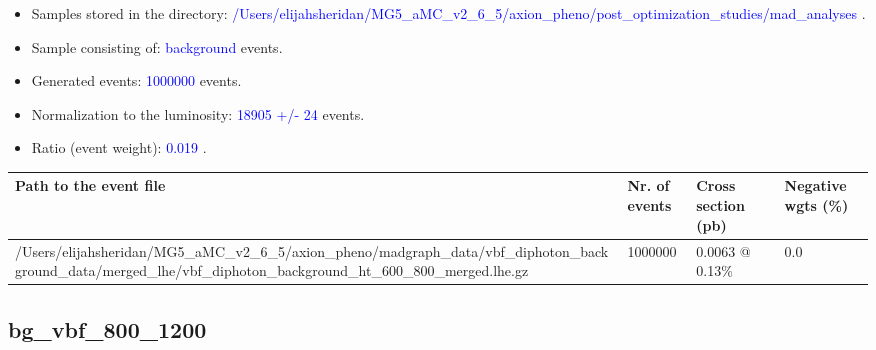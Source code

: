 \documentclass[a4paper, 10pt]{article}
\begin{document}
\begin{itemize}
  \item Samples stored in the directory: \textcolor{blue}{/\-Users/\-elijahsheridan/\-MG5\_aMC\_v2\_6\_5/\-axion\_pheno/\-post\_optimization\_studies/\-mad\_analyses} .
   \item Sample consisting of: \textcolor{blue}{background}  events.
   \item Generated events: \textcolor{blue}{1000000 }  events.
   \item Normalization to the luminosity: \textcolor{blue}{18905}\textcolor{blue}{ +/\-- }\textcolor{blue}{24 }  events.
   \item Ratio (event weight): \textcolor{blue}{0.019 } .  
 
\end{itemize}
\begin{table}[H]
  \begin{center}
    \begin{tabular}{|m{55.0mm}|m{25.0mm}|m{30.0mm}|m{30.0mm}|}
      \hline
      {\cellcolor{yellow}         Path to the event file}& {\cellcolor{yellow}         Nr. of events}& {\cellcolor{yellow}         Cross section (pb)}& {\cellcolor{yellow}         Negative wgts (\%)}\\
      \hline
      {\cellcolor{white}          /\-Users/\-elijahsheridan/\-MG5\_aMC\_v2\_6\_5/\-axion\_pheno/\-madgraph\_data/\-vbf\_diphoton\_background\_data/\-merged\_lhe/\-vbf\_diphoton\_background\_ht\_600\_800\_merged.lhe.gz}& {\cellcolor{white}          1000000}& {\cellcolor{white}          0.0063 @ 0.13\%}& {\cellcolor{white}          0.0}\\
\hline
    \end{tabular}
  \end{center}
\end{table}

\subsection{ bg\_vbf\_800\_1200}
\end{document}
